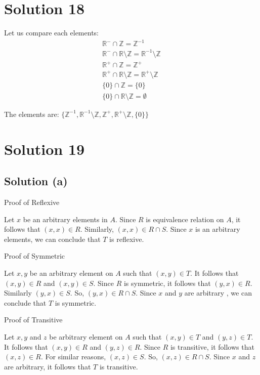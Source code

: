 \documentclass{article}
\begin{document}
\section{Solution 18}
Let us compare each elements:
\begin{align*}
  \mathbb{R}^{-} \cap \mathbb{Z} = \mathbb{Z}^{-1} \\
  \mathbb{R}^{-} \cap \mathbb{R} \setminus \mathbb{Z} = \mathbb{R}^{-1} \setminus \mathbb{Z} \\
  \mathbb{R}^{+} \cap \mathbb{Z} = \mathbb{Z}^{+} \\
  \mathbb{R}^{+} \cap \mathbb{R} \setminus \mathbb{Z} = \mathbb{R}^{+} \setminus \mathbb{Z} \\
  \{0\} \cap \mathbb{Z} = \{0\} \\
  \{0\} \cap \mathbb{R} \setminus \mathbb{Z} = \emptyset 
\end{align*}

The elements are: $\{\mathbb{Z}^{-1}, \mathbb{R}^{-1} \setminus
\mathbb{Z}, \mathbb{Z}^{+}, \mathbb{R}^{+}
\setminus \mathbb{Z}, \{0\}\}$

\section{Solution 19}
\subsection{Solution (a)}
Proof of Reflexive

Let $x$ be an arbitrary elements in $A$. Since $R$ is equivalence
relation on $A$, it follows that $(x,x) \in R$. Similarly, $(x,x) \in
R \cap S$. Since $x$ is an arbitrary elements, we can conclude that
$T$ is reflexive.

Proof of Symmetric

Let $x,y$ be an arbitrary element on $A$ such that $(x,y) \in T$. It
follows that $(x,y) \in R$ and $(x,y) \in S$. Since $R$ is symmetric,
it follows that $(y,x) \in R$. Similarly $(y,x) \in S$. So, $(y,x)\in
R \cap S$. Since $x$ and $y$ are arbitrary , we can conclude that $T$
is symmetric.

Proof of Transitive

Let $x,y$ and $z$ be arbitrary element on $A$ such that $(x,y)\in T$
and $(y,z) \in T$. It follows that $(x,y) \in R$ and $(y,z) \in R$.
Since $R$ is transitive, it follows that $(x,z) \in R$. For similar
reasons, $(x,z) \in S$. So, $(x,z) \in R \cap S$. Since $x$ and $z$
are arbitrary, it follows that $T$ is transitive.
\end{document}
